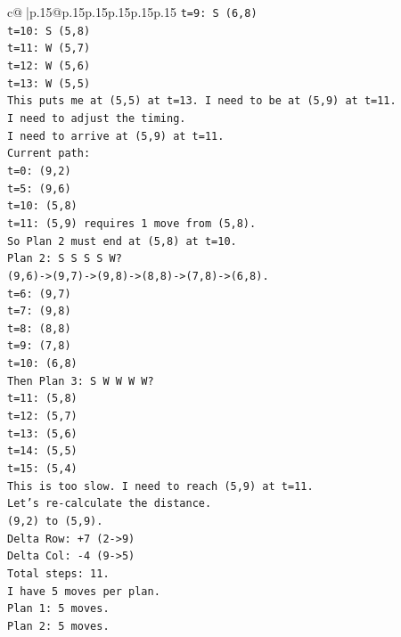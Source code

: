 \documentclass{article}
\begin{document}
{\begin{supertabular}{c@{$\;$}|p{.15\linewidth}@{}p{.15\linewidth}p{.15\linewidth}p{.15\linewidth}p{.15\linewidth}p{.15\linewidth}}
{{{\texttt{t=9: S (6,8)} \\
\texttt{t=10: S (5,8)} \\
\texttt{t=11: W (5,7)} \\
\texttt{t=12: W (5,6)} \\
\texttt{t=13: W (5,5)} \\
\texttt{This puts me at (5,5) at t=13. I need to be at (5,9) at t=11.} \\
\texttt{I need to adjust the timing.} \\
\texttt{I need to arrive at (5,9) at t=11.} \\
\texttt{Current path:} \\
\texttt{t=0: (9,2)} \\
\texttt{t=5: (9,6)} \\
\texttt{t=10: (5,8)} \\
\texttt{t=11: (5,9) requires 1 move from (5,8).} \\
\texttt{So Plan 2 must end at (5,8) at t=10.} \\
\texttt{Plan 2: S S S S W?} \\
\texttt{(9,6){-}>(9,7){-}>(9,8){-}>(8,8){-}>(7,8){-}>(6,8).} \\
\texttt{t=6: (9,7)} \\
\texttt{t=7: (9,8)} \\
\texttt{t=8: (8,8)} \\
\texttt{t=9: (7,8)} \\
\texttt{t=10: (6,8)} \\
\texttt{Then Plan 3: S W W W W?} \\
\texttt{t=11: (5,8)} \\
\texttt{t=12: (5,7)} \\
\texttt{t=13: (5,6)} \\
\texttt{t=14: (5,5)} \\
\texttt{t=15: (5,4)} \\
\texttt{This is too slow. I need to reach (5,9) at t=11.} \\
\texttt{Let's re{-}calculate the distance.} \\
\texttt{(9,2) to (5,9).} \\
\texttt{Delta Row: +7 (2{-}>9)} \\
\texttt{Delta Col: {-}4 (9{-}>5)} \\
\texttt{Total steps: 11.} \\
\texttt{I have 5 moves per plan.} \\
\texttt{Plan 1: 5 moves.} \\
\texttt{Plan 2: 5 moves.} \\
}}}
\end{supertabular}}
\end{document}
